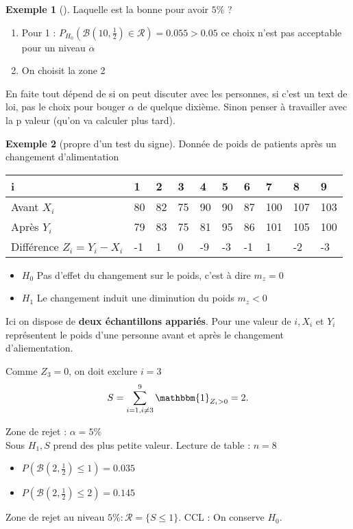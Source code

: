 \documentclass{article}
\theoremstyle{plain}%
\theoremstyle{definition}
\newtheorem{exmp}{Exemple}[section]
\theoremstyle{remark}
\begin{document}
\begin{itemize}
\begin{enumerate}
\begin{exmp}[]
            Laquelle est la bonne pour avoir $ 5\% $ ?\begin{enumerate}
                \item Pour 1 : $ P_{H_0} (\mathcal{B}(10,\frac{1}{2}) \in \mathcal{R}) = 0.055 > 0.05 $ ce choix n'est pas acceptable pour un niveau $ \alpha  $ 
                \item On choisit la zone 2 
            \end{enumerate}
            En faite tout dépend de si on peut discuter avec les personnes, si c'est un text de loi, pas le choix pour bouger $ \alpha  $ de quelque dixième. Sinon penser à travailler avec la p valeur (qu'on va calculer plus tard).
        \end{exmp}
    \end{enumerate}
\end{itemize}

\begin{exmp}[propre d'un test du signe]
    Donnée de poids de patients après un changement d'alimentation\\
    \begin{table}[!h]
        \centering
        \begin{tabular}{|l|l|l|l|l|l|l|l|l|l|}
        \hline
            i & 1 & 2 & 3 & 4 & 5 & 6 & 7 & 8 & 9 \\ \hline
            Avant $X_i$ & 80 & 82 & 75 & 90 & 90 & 87 & 100 & 107 & 103 \\ \hline
            Après $Y_i$ & 79 & 83 & 75 & 81 & 95 & 86 & 101 & 105 & 100 \\ \hline
            Différence $Z_i = Y_i - X_i$ & -1 & 1 & 0 & -9 & -3 & -1 & 1 & -2 & -3 \\ \hline
        \end{tabular}
    \end{table}
    \begin{itemize}
        \item $ H_0 $ Pas d'effet du changement sur le poids, c'est à dire $ m_z = 0 $ 
        \item $ H_1 $ Le changement induit une diminution du poids $ m_z < 0 $ 
    \end{itemize}
    Ici on dispose de \textbf{deux échantillons appariés}. Pour une valeur de $ i, X_i $ et $ Y_i $ représentent le poids d'une personne avant et après le changement d'aliementation.

    Comme $ Z_3 = 0 $, on doit exclure $ i=3 $ 
    \[
        S = \sum_{i=1, i \neq 3}^{9} \mathbbm{1}_{Z_i > 0} = 2
    .\]

    Zone de rejet : $ \alpha = 5\% $ \\
    Sous $ H_1, S $ prend des plus petite valeur. Lecture de table : $ n=8 $ \begin{itemize}
        \item $ P(\mathcal{B}(2, \frac{1}{2}) \leq 1) = 0.035 $ 
        \item $ P(\mathcal{B}(2, \frac{1}{2}) \leq 2) = 0.145 $ 
    \end{itemize}
    Zone de rejet au niveau $ 5\% : \mathcal{R} = \{S \leq 1\}$. CCL : On conserve $ H_0 $.
\end{exmp}
\end{document}
